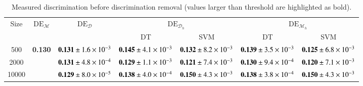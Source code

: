 \documentclass{article}
\begin{document}
\begin{table*}[tbh]\small
\centering
\caption{Measured discrimination before discrimination removal (values larger than threshold are highlighted as bold).}
\label{tab:t1}
\begin{tabular}{|c|c|c|c|c|c|c|}
\hline
\multirow{2}{*}{Size}       & \multirow{2}{*}{$\mathrm{DE}_{\mathcal{M}}$} & \multirow{2}{*}{$\mathrm{DE}_{\mathcal{D}}$} & \multicolumn{2}{c|}{$\mathrm{DE}_{\mathcal{D}_{h}}$} & \multicolumn{2}{c|}{$\mathrm{DE}_{\mathcal{M}_{h}}$} \\ \cline{4-7} 
                            &                                              &                                              & DT                        & SVM                      & DT                        & SVM                      \\ \hline
500                         & \multirow{3}{*}{\textbf{0.130}}                        & $\textbf{0.131} \pm \num{1.6E-3}$                     & $\textbf{0.145} \pm \num{4.1E-3}$  & $\textbf{0.132} \pm \num{8.2E-3}$ & $\textbf{0.139} \pm \num{3.5E-3}$  & $\textbf{0.125} \pm \num{6.8E-3}$ \\ \cline{1-1} \cline{3-7} 
\multicolumn{1}{|c|}{2000}  &                                              & $\textbf{0.131} \pm \num{4.8E-4}$                     & $\textbf{0.129} \pm \num{1.1E-3}$  & $\textbf{0.121} \pm \num{7.4E-3}$ & $\textbf{0.130} \pm \num{9.4E-4}$  & $\textbf{0.120} \pm \num{7.1E-3}$ \\ \cline{1-1} \cline{3-7} 
\multicolumn{1}{|c|}{10000} &                                              & $\textbf{0.129} \pm \num{8.0E-5}$                     & $\textbf{0.138} \pm \num{4.0E-4}$  & $\textbf{0.150} \pm \num{4.3E-3}$ & $\textbf{0.138} \pm \num{3.8E-4}$  & $\textbf{0.150} \pm \num{4.3E-3}$ \\ \hline
\end{tabular}
\end{table*}
\end{document}
